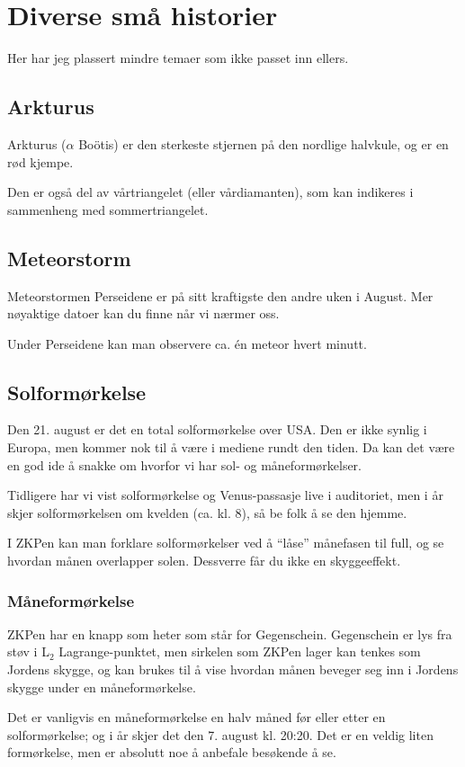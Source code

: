 \documentclass[../SommerstjernerA4.tex]{subfiles}
\begin{document}
\section{Diverse små historier}
Her har jeg plassert mindre temaer som ikke passet inn ellers.
\subsection{Arkturus}
Arkturus ($\alpha$ Boötis) er den sterkeste stjernen på den nordlige halvkule, og er en rød kjempe.

Den er også del av vårtriangelet (eller vårdiamanten), som kan indikeres i sammenheng med sommertriangelet.

\subsection{Meteorstorm}
Meteorstormen Perseidene er på sitt kraftigste den andre uken i August. Mer nøyaktige datoer kan du finne når vi nærmer oss.

Under Perseidene kan man observere ca. én meteor hvert minutt.

\subsection{Solformørkelse}
Den 21. august er det en total solformørkelse over USA. Den er ikke synlig i Europa, men kommer nok til å være i mediene rundt den tiden. Da kan det være en god ide å snakke om hvorfor vi har sol- og måneformørkelser. 

Tidligere har vi vist solformørkelse og Venus-passasje live i auditoriet, men i år skjer solformørkelsen om kvelden (ca. kl. 8), så be folk å se den hjemme.

I ZKPen kan man forklare solformørkelser ved å ``låse'' månefasen til full, og se hvordan månen overlapper solen. Dessverre får du ikke en skyggeeffekt.

\subsubsection*{Måneformørkelse}
ZKPen har en knapp som heter  som står for Gegenschein. Gegenschein er lys fra støv i L$_2$ Lagrange-punktet, men sirkelen som ZKPen lager kan tenkes som Jordens skygge, og kan brukes til å vise hvordan månen beveger seg inn i Jordens skygge under en måneformørkelse.

Det er vanligvis en måneformørkelse en halv måned før eller etter en solformørkelse; og i år skjer det den 7. august kl. 20:20. Det er en veldig liten formørkelse, men er absolutt noe å anbefale besøkende å se.
\end{document}

